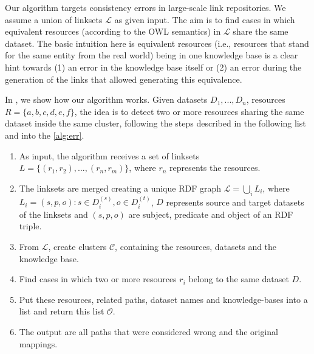 Our algorithm targets consistency errors in large-scale link repositories. We assume a union of linksets $\mathcal{L}$ as given input. The aim is to find cases in which equivalent resources (according to the OWL semantics) in $\mathcal{L}$ share the same dataset. The basic intuition here is equivalent resources (i.e., resources that stand for the same entity from the real world) being in one knowledge base is a clear hint towards (1) an error in the knowledge base itself or (2) an error during the generation of the links that allowed generating this equivalence.



In , we show how our algorithm works. Given datasets $D_1,...,D_n$, resources $R=\{a,b,c,d,e,f\}$, the idea is to detect two or more resources sharing the same dataset inside the same cluster, following the steps described in the following list and into the \cref{alg:err}.

\begin{enumerate}
	\item As input, the algorithm receives a set of linksets $L=\{(r_1,r_2),...,(r_n,r_m)\}$, where $r_n$ represents the resources.
	\item The linksets are merged creating a unique RDF graph $\mathcal{L}= \bigcup_i L_i$, where $L_i={(s,p,o):s \in D_i^{(s)}, o \in D_i^{(t)}}$, $D$ represents source and target datasets of the linksets and $(s,p,o)$ are subject, predicate and object of an RDF triple.
	\item From $\mathcal{L}$, create clusters $\mathcal{C}$, containing the resources, datasets and the knowledge base.
	\item Find cases in which two or more resources $r_i$ belong to the same dataset $D$.
	\item Put these resources, related paths, dataset names and knowledge-bases into a list and return this list $\mathcal{O}$. %
	\item The output are all paths that were considered wrong and the original mappings.
\end{enumerate}

